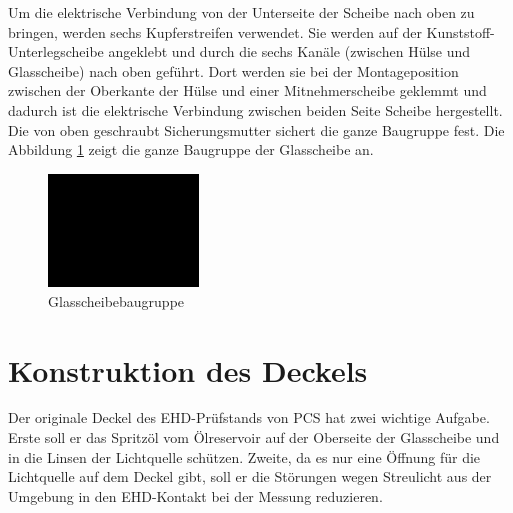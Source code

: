 Um die elektrische Verbindung von der Unterseite der Scheibe nach oben zu bringen, werden sechs Kupferstreifen verwendet.
Sie werden auf der Kunststoff-Unterlegscheibe angeklebt und durch die sechs Kanäle (zwischen Hülse und Glasscheibe) nach oben geführt.
Dort werden sie bei der Montageposition zwischen der Oberkante der Hülse und einer Mitnehmerscheibe geklemmt und dadurch ist die elektrische Verbindung zwischen beiden Seite Scheibe hergestellt.
Die von oben geschraubt Sicherungsmutter sichert die ganze Baugruppe fest.
Die Abbildung \ref{fig:glasscheibebaugruppe} zeigt die ganze Baugruppe der Glasscheibe an.
\begin{figure}[htb]
    \centering
    \includegraphics[width=4cm]{./images/blank_img.jpg}
    \caption{Glasscheibebaugruppe}
    \label{fig:glasscheibebaugruppe}
\end{figure}
%

\section{Konstruktion des Deckels}
\label{sec:konstruktion_des_deckels}

Der originale Deckel des EHD-Prüfstands von PCS hat zwei wichtige Aufgabe.
Erste soll er das Spritzöl vom Ölreservoir auf der Oberseite der Glasscheibe und in die Linsen der Lichtquelle schützen.
Zweite, da es nur eine Öffnung für die Lichtquelle auf dem Deckel gibt, soll er die Störungen wegen Streulicht aus der Umgebung in den EHD-Kontakt bei der Messung reduzieren.

